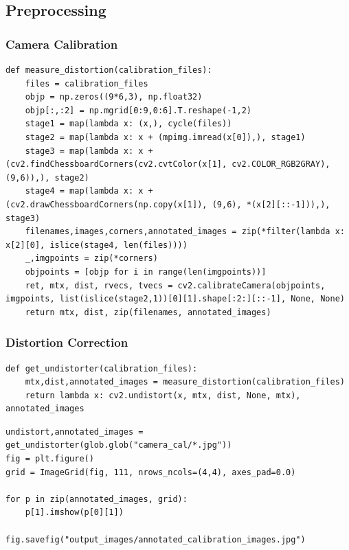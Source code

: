 \documentclass[11pt]{article}
\begin{document}
\subsection*{Preprocessing}
\label{sec-2-2}

\subsubsection*{Camera Calibration}
\label{sec-2-2-1}

\begin{verbatim}
def measure_distortion(calibration_files):
    files = calibration_files
    objp = np.zeros((9*6,3), np.float32)
    objp[:,:2] = np.mgrid[0:9,0:6].T.reshape(-1,2)
    stage1 = map(lambda x: (x,), cycle(files))
    stage2 = map(lambda x: x + (mpimg.imread(x[0]),), stage1)
    stage3 = map(lambda x: x + (cv2.findChessboardCorners(cv2.cvtColor(x[1], cv2.COLOR_RGB2GRAY), (9,6)),), stage2)
    stage4 = map(lambda x: x + (cv2.drawChessboardCorners(np.copy(x[1]), (9,6), *(x[2][::-1])),), stage3)
    filenames,images,corners,annotated_images = zip(*filter(lambda x: x[2][0], islice(stage4, len(files))))
    _,imgpoints = zip(*corners)
    objpoints = [objp for i in range(len(imgpoints))]
    ret, mtx, dist, rvecs, tvecs = cv2.calibrateCamera(objpoints, imgpoints, list(islice(stage2,1))[0][1].shape[:2:][::-1], None, None)
    return mtx, dist, zip(filenames, annotated_images)
\end{verbatim}

\subsubsection*{Distortion Correction}
\label{sec-2-2-2}

\begin{verbatim}
def get_undistorter(calibration_files):
    mtx,dist,annotated_images = measure_distortion(calibration_files)
    return lambda x: cv2.undistort(x, mtx, dist, None, mtx), annotated_images
\end{verbatim}

\begin{verbatim}
undistort,annotated_images = get_undistorter(glob.glob("camera_cal/*.jpg"))
fig = plt.figure()
grid = ImageGrid(fig, 111, nrows_ncols=(4,4), axes_pad=0.0)

for p in zip(annotated_images, grid):
    p[1].imshow(p[0][1])

fig.savefig("output_images/annotated_calibration_images.jpg")
\end{verbatim}
\end{document}
